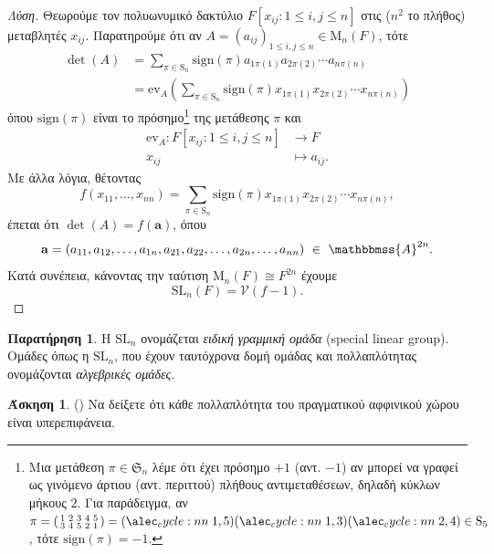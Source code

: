 \documentclass[12pt,a4paper,reqno]{amsart}
\theoremstyle{definition}
\newtheorem{exercise}{Άσκηση}
\newtheorem*{remark}{Παρατήρηση}
\renewcommand{\AA}{\mathbbmss{A}}
\newcommand{\fS}{\mathfrak{S}}
\newcommand{\vV}{\mathcal{V}}
\newcommand{\bfa}{\mathbf{a}}
\newcommand{\rmM}{\mathrm{M}}
\newcommand{\rmS}{\mathrm{S}}
\newcommand{\SL}{\mathrm{SL}}
\renewcommand{\to}{\rightarrow}
\newcommand{\ev}{\mathrm{ev}}
\begin{document}
\begin{proof}[Λύση]
  Θεωρούμε τον πολυωνυμικό δακτύλιο $F[x_{ij} : 1 \le i, j \le n]$ στις ($n^2$ το πλήθος) μεταβλητές $x_{ij}$. Παρατηρούμε ότι αν $A = (a_{ij})_{1 \le i, j \le n} \in \rmM_n(F)$, τότε 
  \begin{align*}
  \det(A) 
  &= \sum_{\pi \in \rmS_n} \mathrm{sign}(\pi) a_{1\pi(1)}a_{2\pi(2)}\cdots a_{n\pi(n)} \\
  &= \ev_A\left(
    \sum_{\pi \in \rmS_n} \mathrm{sign}(\pi) x_{1\pi(1)}x_{2\pi(2)}\cdots x_{n\pi(n)}
  \right)
  \end{align*}
  όπου $\mathrm{sign}(\pi)$ είναι το πρόσημο\footnote{Μια μετάθεση $\pi \in \fS_n$ λέμε ότι έχει πρόσημο $+1$ (αντ. $-1$) αν μπορεί να γραφεί ως γινόμενο άρτιου (αντ. περιττού) πλήθους αντιμεταθέσεων, δηλαδή κύκλων μήκους $2$. Για παράδειγμα, αν $\pi = \left(
    \begin{smallmatrix}
      1 & 2 & 3 & 4 & 5 \\
      3 & 4 & 5 & 2 & 1 
    \end{smallmatrix}
  \right) = \cycle{1,5}\cycle{1,3}\cycle{2,4} \in \rmS_5$, τότε $\mathrm{sign}(\pi) = -1$.} της μετάθεσης $\pi$ και 
  \begin{align*}
    \ev_A : F[x_{ij} : 1 \le i, j \le n] &\to F \\
    x_{ij} &\mapsto a_{ij}.
  \end{align*}
  Με άλλα λόγια, θέτοντας 
  \[
  f(x_{11}, \dots, x_{nn}) = \sum_{\pi \in \rmS_n} \mathrm{sign}(\pi) x_{1\pi(1)}x_{2\pi(2)}\cdots x_{n\pi(n)},
  \]
  έπεται ότι $\det(A) = f(\bfa)$, όπου 
  \[
  \bfa = \left(
    a_{11}, a_{12}, \dots, a_{1n}, a_{21}, a_{22}, \dots, a_{2n}, \dots, a_{nn} 
  \right) \ \in \ \AA^{2n}.
  \]
  Κατά συνέπεια, κάνοντας την ταύτιση $\rmM_n(F) \cong F^{2n}$ έχουμε
  \[
  \SL_n(F) = \vV(f-1).
  \]
\end{proof}

\begin{remark}
  Η $\SL_n$ ονομάζεται \emph{ειδική γραμμική ομάδα} (special linear group). Ομάδες όπως η $\SL_n$, που έχουν ταυτόχρονα δομή ομάδας και πολλαπλότητας ονομάζονται \emph{αλγεβρικές ομάδες}.
\end{remark}

\begin{exercise}{\rm(\cite[Άσκηση~4.1.1~(b)]{CLOS15})}
  Να δείξετε ότι κάθε πολλαπλότητα του πραγματικού αφφινικού χώρου είναι υπερεπιφάνεια.
\end{exercise}
\end{document}
